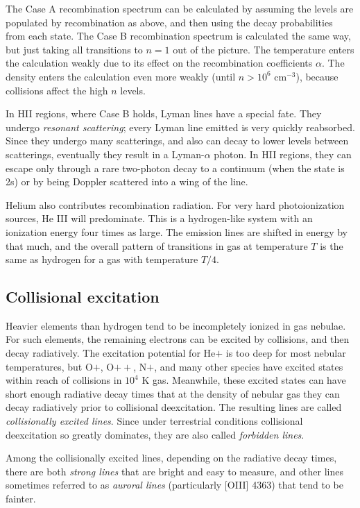 The Case A recombination spectrum can be calculated by assuming the
levels are populated by recombination as above, and then using the
decay probabilities from each state. The Case B recombination spectrum
is calculated the same way, but just taking all transitions to $n=1$
out of the picture. The temperature enters the calculation weakly due
to its effect on the recombination coefficients $\alpha$. The density
enters the calculation even more weakly (until $n>10^6$ cm$^{-3}$),
because collisions affect the high $n$ levels.

In HII regions, where Case B holds, Lyman lines have a special
fate. They undergo {\it resonant scattering}; every Lyman line emitted
is very quickly reabsorbed. Since they undergo many scatterings, and
also can decay to lower levels between scatterings, eventually they
result in a Lyman-$\alpha$ photon. In HII regions, they can escape
only through a rare two-photon decay to a continuum (when the state is
2s) or by being Doppler scattered into a wing of the line. 

Helium also contributes recombination radiation. For very hard
photoionization sources, He III will predominate. This is a
hydrogen-like system with an ionization energy four times as
large. The emission lines are shifted in energy by that much, and the
overall pattern of transitions in gas at temperature $T$ is the same
as hydrogen for a gas with temperature $T/4$.

\subsection{Collisional excitation}

Heavier elements than hydrogen tend to be incompletely ionized in gas
nebulae. For such elements, the remaining electrons can be excited by
collisions, and then decay radiatively. The excitation potential for
He$+$ is too deep for most nebular temperatures, but O$+$, O$++$,
N$+$, and many other species have excited states within reach of
collisions in $10^4$ K gas. Meanwhile, these excited states can have
short enough radiative decay times that at the density of nebular gas
they can decay radiatively prior to collisional deexcitation. The
resulting lines are called {\it collisionally excited lines}. Since
under terrestrial conditions collisional deexcitation so greatly
dominates, they are also called {\it forbidden lines}.

Among the collisionally excited lines, depending on the radiative
decay times, there are both {\it strong lines} that are bright and
easy to measure, and other lines sometimes referred to as {\it auroral
lines} (particularly [OIII] 4363) that tend to be fainter.

